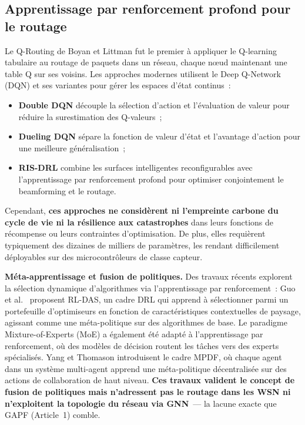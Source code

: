 \subsection{Apprentissage par renforcement profond pour le routage}

Le Q-Routing de Boyan et Littman \cite{boyan1994packet} fut le premier à appliquer le Q-learning tabulaire au routage de paquets dans un réseau, chaque n\oe{}ud maintenant une table Q sur ses voisins. Les approches modernes utilisent le Deep Q-Network (DQN) \cite{mnih2015dqn} et ses variantes pour gérer les espaces d'état continus~:

\begin{itemize}
    \item \textbf{Double DQN} découple la sélection d'action et l'évaluation de valeur pour réduire la surestimation des Q-valeurs~;
    \item \textbf{Dueling DQN} sépare la fonction de valeur d'état et l'avantage d'action pour une meilleure généralisation~;
    \item \textbf{RIS-DRL} combine les surfaces intelligentes reconfigurables avec l'apprentissage par renforcement profond pour optimiser conjointement le beamforming et le routage.
\end{itemize}

Cependant, \textbf{ces approches ne considèrent ni l'empreinte carbone du cycle de vie ni la résilience aux catastrophes} dans leurs fonctions de récompense ou leurs contraintes d'optimisation. De plus, elles requièrent typiquement des dizaines de milliers de paramètres, les rendant difficilement déployables sur des microcontrôleurs de classe capteur.

\textbf{Méta-apprentissage et fusion de politiques.} Des travaux récents explorent la sélection dynamique d'algorithmes via l'apprentissage par renforcement~: Guo et al.\ \cite{guo2024rldas} proposent RL-DAS, un cadre DRL qui apprend à sélectionner parmi un portefeuille d'optimiseurs en fonction de caractéristiques contextuelles de paysage, agissant comme une méta-politique sur des algorithmes de base. Le paradigme Mixture-of-Experts (MoE) a également été adapté à l'apprentissage par renforcement, où des modèles de décision routent les tâches vers des experts spécialisés. Yang et Thomason \cite{yang2025meta_deliberation} introduisent le cadre MPDF, où chaque agent dans un système multi-agent apprend une méta-politique décentralisée sur des actions de collaboration de haut niveau. \textbf{Ces travaux valident le concept de fusion de politiques mais n'adressent pas le routage dans les WSN ni n'exploitent la topologie du réseau via GNN}~--- la lacune exacte que GAPF (Article~1) comble.

